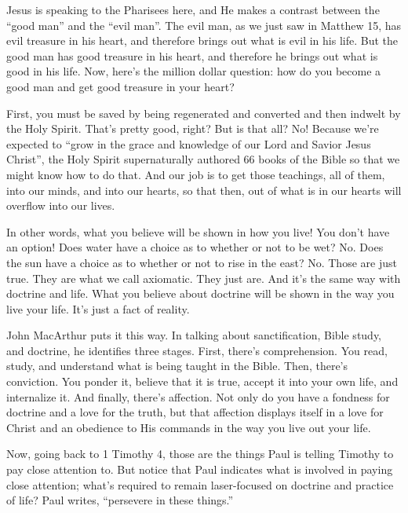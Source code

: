 \documentclass[letterpaper, 12pt]{article}
\begin{document}
    Jesus is speaking to the Pharisees here, and He makes a contrast
    between the ``good man'' and the ``evil man''. The evil man, as we
    just saw in Matthew 15, has evil treasure in his heart, and
    therefore brings out what is evil in his life. But the good man has
    good treasure in his heart, and therefore he brings out what is good
    in his life. Now, here's the million dollar question: how do you
    become a good man and get good treasure in your heart? 

    First, you must be saved by being regenerated and converted and then
    indwelt by the Holy Spirit. That's pretty good, right? But is that
    all? No! Because we're expected to ``grow in the grace and knowledge
    of our Lord and Savior Jesus Christ'', the Holy Spirit
    supernaturally authored 66 books of the Bible so that we might know
    how to do that. And our job is to get those teachings, all of them,
    into our minds, and into our hearts, so that then, out of what is in
    our hearts will overflow into our lives. 

    In other words, what you believe will be shown in how you live! You
    don't have an option! Does water have a choice as to whether or not
    to be wet? No. Does the sun have a choice as to whether or not to
    rise in the east? No. Those are just true. They are what we call
    axiomatic. They just are. And it's the same way with doctrine and
    life. What you believe about doctrine will be shown in the way you
    live your life. It's just a fact of reality. 

    John MacArthur puts it this way. In talking about sanctification,
    Bible study, and doctrine, he identifies three stages. First,
    there's comprehension. You read, study, and understand what is being
    taught in the Bible. Then, there's conviction. You ponder it,
    believe that it is true, accept it into your own life, and
    internalize it. And finally, there's affection. Not only do you have
    a fondness for doctrine and a love for the truth, but that affection
    displays itself in a love for Christ and an obedience to His
    commands in the way you live out your life.

    Now, going back to 1 Timothy 4, those are the things Paul is telling
    Timothy to pay close attention to. But notice that Paul indicates
    what is involved in paying close attention; what's required to
    remain laser-focused on doctrine and practice of life? Paul writes,
    ``persevere in these things.''
\end{document}
